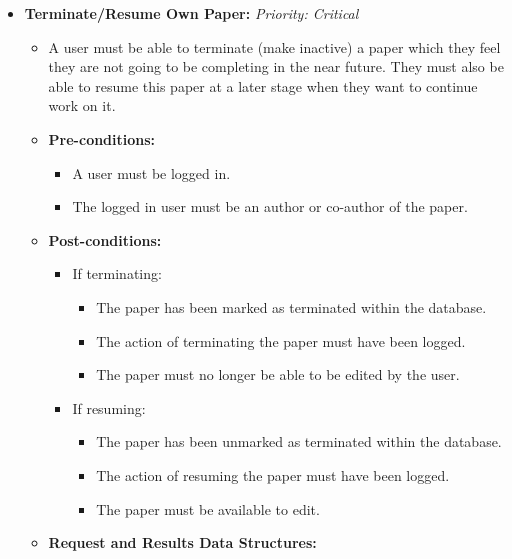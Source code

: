 \documentclass{article}
\begin{document}
\begin{itemize}
					\item \textbf{Terminate/Resume Own Paper:} \hfill \textit{Priority: Critical}
					\begin{itemize}
						\item A user must be able to terminate (make inactive) a paper which they feel they are not going to be completing in the near future. They must also be able to resume this paper at a later stage when they want to continue work on it.
						\item \textbf{Pre-conditions:}
						\begin{itemize}
							\item A user must be logged in.
							\item The logged in user must be an author or co-author of the paper.
						\end{itemize}
						\item \textbf{Post-conditions:}
						\begin{itemize}
							\item If terminating:
							\begin{itemize}
								\item The paper has been marked as terminated within the database.
								\item The action of terminating the paper must have been logged.
								\item The paper must no longer be able to be edited by the user.
							\end{itemize}
							\item If resuming:
							\begin{itemize}
								\item The paper has been unmarked as terminated within the database.
								\item The action of resuming the paper must have been logged.
								\item The paper must be available to edit.
							\end{itemize}
						\end{itemize}
						\item \textbf{Request and Results Data Structures:}
					\end{itemize}
					

\end{itemize}
\end{document}
